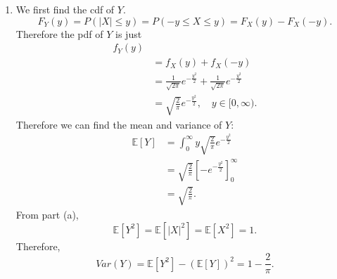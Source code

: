 \documentclass{article}
\begin{document}
\begin{enumerate}
\begin{enumerate}
        \item We first find the cdf of $Y$.
        \[ F_{Y}(y) = P(|X| \leq y) = P(-y \leq X \leq y) = F_{X}(y) - F_{X}(-y). \]
        Therefore the pdf of $Y$ is just 
        \begin{align*}
            f_{Y}(y) \\
            &= f_{X}(y) + f_{X}(-y) \\
            &= \frac{1}{\sqrt{2\pi}} e^{-\frac{y^2}{2}} 
            + \frac{1}{\sqrt{2\pi}} e^{-\frac{y^2}{2}} \\
            &= \sqrt{\frac{2}{\pi}} e^{-\frac{y^2}{2}}, \quad y \in [0, \infty).
        \end{align*}
        Therefore we can find the mean and variance of $Y$: 
        \begin{align*}
            \mathbb{E}[Y]
            &= \int_{0}^{\infty} y \sqrt{\frac{2}{\pi}} e^{-\frac{y^2}{2}} \\
            &= \sqrt{\frac{2}{\pi}} [-e^{-\frac{y^2}{2}}]_{0}^{\infty} \\
            &= \sqrt{\frac{2}{\pi}}.
        \end{align*}
        From part (a), 
        \[ \mathbb{E}[Y^2] = \mathbb{E}[|X|^2] = \mathbb{E}[X^2] = 1. \]
        Therefore, 
        \[ Var(Y) = \mathbb{E}[Y^2] - (\mathbb{E}[Y])^2 = 1 - \frac{2}{\pi}. \]
    \end{enumerate}
\end{enumerate}
\end{document}
